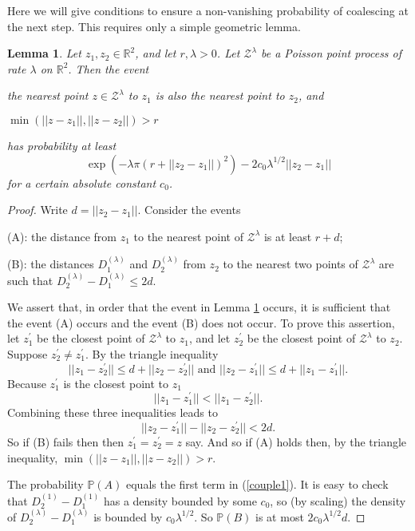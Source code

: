 \documentclass[12pt]{article}
\newtheorem{Lemma}{Lemma}
\newcommand{\ZZ}{\mbox{${\mathcal Z}$}}
\newcommand{\Reals}{{\mathbb{R}}}
\renewcommand{\Pr}{{\mathbb P}}
\begin{document}
Here we will give conditions to ensure a non-vanishing probability of coalescing at the next step.
This requires only a simple geometric lemma.
\begin{Lemma}
\label{Lzz}
Let $z_1, z_2 \in \Reals^2$, and let $r, \lambda > 0$.  Let $\ZZ^\lambda$ be a Poisson point process of 
rate $\lambda$ on $\Reals^2$.  Then the event

the nearest point $z \in \ZZ^\lambda$ to $z_1$ is also the nearest point to $z_2$, 
and 

$\min (||z - z_1||, ||z - z_2||) > r$

\noindent
has probability at least
\begin{equation}
\exp(- \lambda \pi (r + ||z_2 - z_1||)^2) - 2 c_0 \lambda^{1/2} ||z_2 - z_1||\label{couple1}
\end{equation}
for a certain absolute constant $c_0$.
\end{Lemma}
\begin{proof}
Write $d = ||z_2 - z_1||$.  
Consider the events

(A): the distance from $z_1$ to the nearest point of $\ZZ^\lambda$ is at least 
$r+d$; 

(B): the distances $D_1^{(\lambda)}$ and  $D_2^{(\lambda)}$ 
 from $z_2$ to the nearest two points of $\ZZ^\lambda$ are 
such that
$D_2^{(\lambda)} - D_1^{(\lambda)} \le 2d$.

\medskip
\noindent
We assert that, in order that the event in Lemma \ref{Lzz} occurs, it is sufficient that the event
(A) occurs and the event (B) does not occur. 
To prove this assertion, let $z^\prime_1$ be the closest point of $\ZZ^\lambda$ to $z_1$, and  
let $z^\prime_2$ be the closest point of $\ZZ^\lambda$ to $z_2$. 
Suppose $z^\prime_2 \neq z^\prime_1$.
By the triangle inequality
\[ ||z_1 - z^\prime_2|| \le d + ||z_2 - z^\prime_2|| 
\mbox{ and } 
||z_2 - z^\prime_1|| \le d + ||z_1 - z^\prime_1|| . \]
Because $z^\prime_1$ is the closest point to $z_1$
\[ ||z_1 - z^\prime_1|| < ||z_1 - z^\prime_2|| . \]
Combining these three inequalities leads to
\[ ||z_2 - z^\prime_1|| - ||z_2 - z^\prime_2|| < 2d . \]
So if (B) fails then then $z^\prime_1 = z^\prime_2 = z$ say.
And so if (A) holds then, by the triangle inequality, 
$\min (||z - z_1||, ||z - z_2||) > r$.

The probability $\Pr(A)$  equals the first term
in (\ref{couple1}).  It is easy to check that 
$D_2^{(1)} - D_1^{(1)}$  has a density bounded by some $c_0$, so (by scaling) the density of 
$D_2^{(\lambda)} - D_1^{(\lambda)}$ is bounded by $c_0 \lambda^{1/2}$. 
So $\Pr(B)$ is at most $2 c_0 \lambda^{1/2}d$. 
\end{proof}
\end{document}
